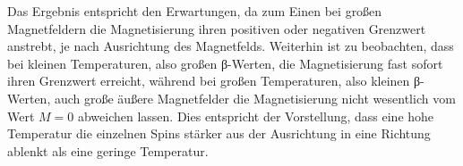 Das Ergebnis entspricht den Erwartungen, da zum Einen bei großen Magnetfeldern die Magnetisierung
ihren positiven oder negativen Grenzwert anstrebt, je nach Ausrichtung des Magnetfelds.
Weiterhin ist zu beobachten, dass bei kleinen Temperaturen, also großen β-Werten,
die Magnetisierung fast sofort ihren Grenzwert erreicht, während bei großen Temperaturen,
also kleinen β-Werten, auch große äußere Magnetfelder die Magnetisierung nicht 
wesentlich vom Wert $M=0$ abweichen lassen. Dies entspricht der Vorstellung, dass
eine hohe Temperatur die einzelnen Spins stärker aus der Ausrichtung in eine
Richtung ablenkt als eine geringe Temperatur.